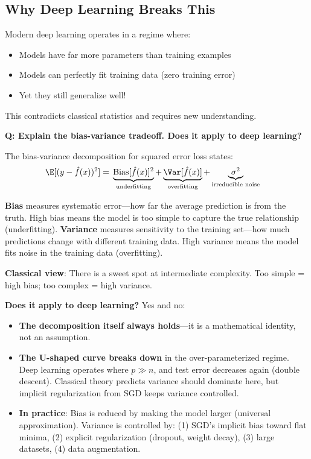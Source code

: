 \subsection{Why Deep Learning Breaks This}

Modern deep learning operates in a regime where:
\begin{itemize}
    \item Models have far more parameters than training examples
    \item Models can perfectly fit training data (zero training error)
    \item Yet they still generalize well!
\end{itemize}

This contradicts classical statistics and requires new understanding.

\begin{interviewq}
\textbf{Q: Explain the bias-variance tradeoff. Does it apply to deep learning?}

 \quad {} \quad \badgefreq{\freqhigh}

\stronganswer
The bias-variance decomposition for squared error loss states:
\begin{align*}
\E[(y - \hat{f}(x))^2] = \; &\underbrace{\text{Bias}[\hat{f}(x)]^2}_{\text{underfitting}} + \underbrace{\Var[\hat{f}(x)]}_{\text{overfitting}} + \underbrace{\sigma^2}_{\text{irreducible noise}}
\end{align*}

\textbf{Bias} measures systematic error---how far the average prediction is from the truth. High bias means the model is too simple to capture the true relationship (underfitting). \textbf{Variance} measures sensitivity to the training set---how much predictions change with different training data. High variance means the model fits noise in the training data (overfitting).

\textbf{Classical view}: There is a sweet spot at intermediate complexity. Too simple = high bias; too complex = high variance.

\textbf{Does it apply to deep learning?} Yes and no:
\begin{itemize}
    \item \textbf{The decomposition itself always holds}---it is a mathematical identity, not an assumption.
    \item \textbf{The U-shaped curve breaks down} in the over-parameterized regime. Deep learning operates where $p \gg n$, and test error decreases again (double descent). Classical theory predicts variance should dominate here, but implicit regularization from SGD keeps variance controlled.
    \item \textbf{In practice}: Bias is reduced by making the model larger (universal approximation). Variance is controlled by: (1) SGD's implicit bias toward flat minima, (2) explicit regularization (dropout, weight decay), (3) large datasets, (4) data augmentation.
\end{itemize}


\end{interviewq}
